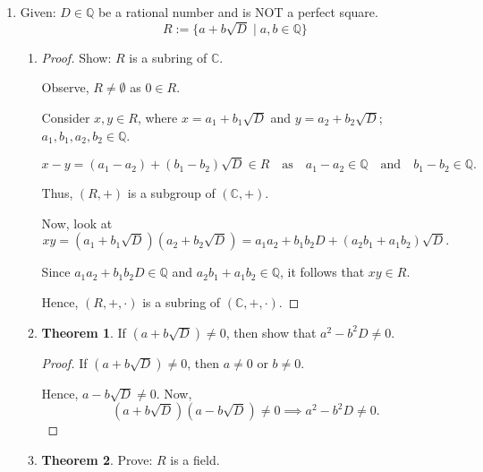 \documentclass[11pt]{article}
\theoremstyle{definition}
\newtheorem{theorem}{Theorem}[section]
\theoremstyle{remark}
\begin{document}
\begin{enumerate}
    \item Given: $D \in \mathbb{Q}$ be a rational number and is NOT a perfect square.
    \[
    R := \{a + b\sqrt{D} \mid a, b \in \mathbb{Q}\}
    \]

    \begin{enumerate}
        \item[(a)]
        \begin{proof}
            Show: $R$ is a subring of $\mathbb{C}$.

            Observe, $R \neq \emptyset$ as $0 \in R$.

            Consider $x, y \in R$, where $x = a_1 + b_1\sqrt{D}$ and $y = a_2 + b_2\sqrt{D}$; $a_1, b_1, a_2, b_2 \in \mathbb{Q}$.

            \[
            x - y = (a_1 - a_2) + (b_1 - b_2)\sqrt{D} \in R \quad \text{as} \quad a_1 - a_2 \in \mathbb{Q} \quad \text{and} \quad b_1 - b_2 \in \mathbb{Q}.
            \]

            Thus, $(R, +)$ is a subgroup of $(\mathbb{C}, +)$.

            Now, look at
            \[
            xy = (a_1 + b_1\sqrt{D})(a_2 + b_2\sqrt{D}) = a_1a_2 + b_1b_2D + (a_2b_1 + a_1b_2)\sqrt{D}.
            \]

            Since $a_1a_2 + b_1b_2D \in \mathbb{Q}$ and $a_2b_1 + a_1b_2 \in \mathbb{Q}$, it follows that $xy \in R$.

            Hence, $(R, +, \cdot)$ is a subring of $(\mathbb{C}, +, \cdot)$.
        \end{proof}

        \item[(b)]
        \begin{theorem}\label{thm:nonzero_element}
            If $(a + b\sqrt{D}) \neq 0$, then show that $a^2 - b^2D \neq 0$.
        \end{theorem}

        \begin{proof}
            If $(a + b\sqrt{D}) \neq 0$, then $a \neq 0$ or $b \neq 0$.

            Hence, $a - b\sqrt{D} \neq 0$. Now,
            \[
            (a + b\sqrt{D})(a - b\sqrt{D}) \neq 0 \implies a^2 - b^2D \neq 0.
            \]
        \end{proof}

        \item[(c)]
        \begin{theorem}\label{thm:field_property}
            Prove: $R$ is a field.
        \end{theorem}


\end{enumerate}
\end{enumerate}
\end{document}
